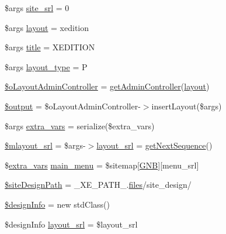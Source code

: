 \begin{DoxyCompactItemize}
\item 
\$args \hyperlink{ko_8install_8php_a8b1406b4ad1048041558dce6bfe89004}{site\+\_\+srl} = 0
\item 
\$args \hyperlink{ko_8install_8php_a0dc2cdff7167f362443808ff71ae5177}{layout} = \textquotesingle{}xedition\textquotesingle{}
\item 
\$args \hyperlink{ko_8install_8php_a5b072c5fd1d2228c6ba5cee13cd142e3}{title} = \textquotesingle{}X\+E\+D\+I\+T\+I\+ON\textquotesingle{}
\item 
\$args \hyperlink{ko_8install_8php_a0532d89570cfdaebc628afac2ff5a81b}{layout\+\_\+type} = \textquotesingle{}P\textquotesingle{}
\item 
\hyperlink{ko_8install_8php_a6a03496003da7df71cf94d9accb430be}{\$o\+Layout\+Admin\+Controller} = \hyperlink{func_8inc_8php_a2f7ca88a5226536aca3b2f5682bd7b2d}{get\+Admin\+Controller}(\textquotesingle{}\hyperlink{classlayout}{layout}\textquotesingle{})
\item 
\hyperlink{ko_8install_8php_a73004ce9cd673c1bfafd1dc351134797}{\$output} = \$o\+Layout\+Admin\+Controller-\/$>$insert\+Layout(\$args)
\item 
\$args \hyperlink{ko_8install_8php_ae1dcb37fc34a8f312d2e6abd6f806743}{extra\+\_\+vars} = serialize(\$extra\+\_\+vars)
\item 
\hyperlink{ko_8install_8php_a576210f0eec2e42df2c40e04a3972bb0}{\$mlayout\+\_\+srl} = \$args-\/$>$\hyperlink{ko_8install_8php_a70054876db09b2519a1726663c8dd9e7}{layout\+\_\+srl} = \hyperlink{func_8inc_8php_a5a97b458f9c5b4fe3574671840aee27c}{get\+Next\+Sequence}()
\item 
\$\hyperlink{ko_8install_8php_ae1dcb37fc34a8f312d2e6abd6f806743}{extra\+\_\+vars} \hyperlink{ko_8install_8php_ac71104c770b8ced3891f35849d3f2906}{main\+\_\+menu} = \$sitemap\mbox{[}\textquotesingle{}\hyperlink{ko_8install_8php_a9b1716b68fc04f3492448f38148dcbf5}{G\+NB}\textquotesingle{}\mbox{]}\mbox{[}\textquotesingle{}menu\+\_\+srl\textquotesingle{}\mbox{]}
\item 
\hyperlink{ko_8install_8php_a0b79a974b91157b79d83cc0be7e3247c}{\$site\+Design\+Path} = \+\_\+\+X\+E\+\_\+\+P\+A\+T\+H\+\_\+.\textquotesingle{}\hyperlink{popup_8min_8js_a0742cac2750bccc2d88ac080fb9daa22}{files}/site\+\_\+design/\textquotesingle{}
\item 
\hyperlink{ko_8install_8php_a99e144f7d563ceb76b003d54739b3b0c}{\$design\+Info} = new std\+Class()
\item 
\$design\+Info \hyperlink{ko_8install_8php_a70054876db09b2519a1726663c8dd9e7}{layout\+\_\+srl} = \$layout\+\_\+srl

\end{DoxyCompactItemize}

